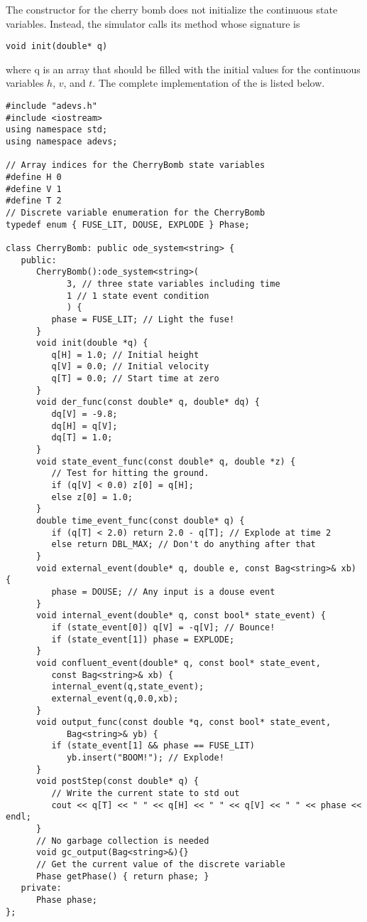 The constructor for the cherry bomb does not initialize the continuous state variables. Instead, the simulator calls its  method whose signature is
\begin{verbatim}
void init(double* q)
\end{verbatim}
where q is an array that should be filled with the initial values for the continuous variables $h$, $v$, and $t$. The complete implementation of the  is listed below.
\begin{verbatim}
#include "adevs.h"
#include <iostream>
using namespace std;
using namespace adevs;

// Array indices for the CherryBomb state variables
#define H 0
#define V 1
#define T 2
// Discrete variable enumeration for the CherryBomb
typedef enum { FUSE_LIT, DOUSE, EXPLODE } Phase;

class CherryBomb: public ode_system<string> {
   public:
      CherryBomb():ode_system<string>(
            3, // three state variables including time
            1 // 1 state event condition
            ) {
         phase = FUSE_LIT; // Light the fuse!
      }
      void init(double *q) {
         q[H] = 1.0; // Initial height
         q[V] = 0.0; // Initial velocity
         q[T] = 0.0; // Start time at zero
      }
      void der_func(const double* q, double* dq) {
         dq[V] = -9.8; 
         dq[H] = q[V]; 
         dq[T] = 1.0; 
      }
      void state_event_func(const double* q, double *z) {
         // Test for hitting the ground. 
         if (q[V] < 0.0) z[0] = q[H];
         else z[0] = 1.0;
      }
      double time_event_func(const double* q) {
         if (q[T] < 2.0) return 2.0 - q[T]; // Explode at time 2
         else return DBL_MAX; // Don't do anything after that
      }
      void external_event(double* q, double e, const Bag<string>& xb) {
         phase = DOUSE; // Any input is a douse event
      }
      void internal_event(double* q, const bool* state_event) {
         if (state_event[0]) q[V] = -q[V]; // Bounce!
         if (state_event[1]) phase = EXPLODE;
      }
      void confluent_event(double* q, const bool* state_event,
         const Bag<string>& xb) {
         internal_event(q,state_event);
         external_event(q,0.0,xb);
      }
      void output_func(const double *q, const bool* state_event,
            Bag<string>& yb) {
         if (state_event[1] && phase == FUSE_LIT)
            yb.insert("BOOM!"); // Explode!
      }
      void postStep(const double* q) {
         // Write the current state to std out
         cout << q[T] << " " << q[H] << " " << q[V] << " " << phase << endl;
      }
      // No garbage collection is needed
      void gc_output(Bag<string>&){}
      // Get the current value of the discrete variable
      Phase getPhase() { return phase; } 
   private:
      Phase phase;
};
\end{verbatim}


